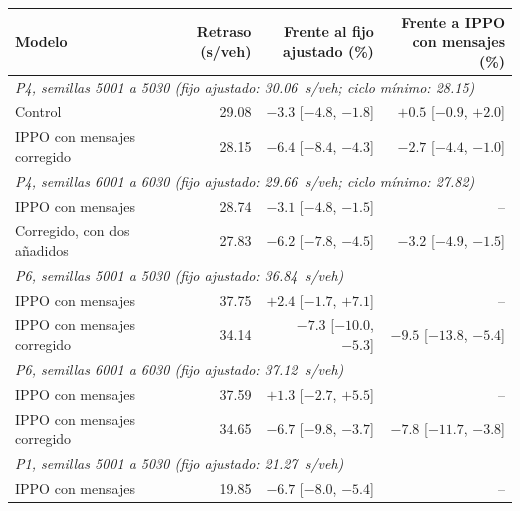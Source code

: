 \begin{table}[H]
\centering
\footnotesize
\setlength{\tabcolsep}{4pt}
\begin{tabular}{lrrr}
\toprule
Modelo & \makecell{Retraso\\(s/veh)} & \makecell{Frente al fijo\\ajustado (\%)} & \makecell{Frente a IPPO\\con mensajes (\%)} \\
\midrule
\multicolumn{4}{l}{\textit{P4, semillas 5001 a 5030 (fijo ajustado: 30.06~s/veh; ciclo mínimo: 28.15)}} \\
Control & 29.08 & $-3.3$ [$-4.8$, $-1.8$] & $+0.5$ [$-0.9$, $+2.0$] \\
IPPO con mensajes corregido & 28.15 & $-6.4$ [$-8.4$, $-4.3$] & $-2.7$ [$-4.4$, $-1.0$] \\
\multicolumn{4}{l}{\textit{P4, semillas 6001 a 6030 (fijo ajustado: 29.66~s/veh; ciclo mínimo: 27.82)}} \\
IPPO con mensajes & 28.74 & $-3.1$ [$-4.8$, $-1.5$] & -- \\
Corregido, con dos añadidos & 27.83 & $-6.2$ [$-7.8$, $-4.5$] & $-3.2$ [$-4.9$, $-1.5$] \\
\multicolumn{4}{l}{\textit{P6, semillas 5001 a 5030 (fijo ajustado: 36.84~s/veh)}} \\
IPPO con mensajes & 37.75 & $+2.4$ [$-1.7$, $+7.1$] & -- \\
IPPO con mensajes corregido & 34.14 & $-7.3$ [$-10.0$, $-5.3$] & $-9.5$ [$-13.8$, $-5.4$] \\
\multicolumn{4}{l}{\textit{P6, semillas 6001 a 6030 (fijo ajustado: 37.12~s/veh)}} \\
IPPO con mensajes & 37.59 & $+1.3$ [$-2.7$, $+5.5$] & -- \\
IPPO con mensajes corregido & 34.65 & $-6.7$ [$-9.8$, $-3.7$] & $-7.8$ [$-11.7$, $-3.8$] \\
\multicolumn{4}{l}{\textit{P1, semillas 5001 a 5030 (fijo ajustado: 21.27~s/veh)}} \\
IPPO con mensajes & 19.85 & $-6.7$ [$-8.0$, $-5.4$] & -- \\

\end{tabular}
\end{table}

